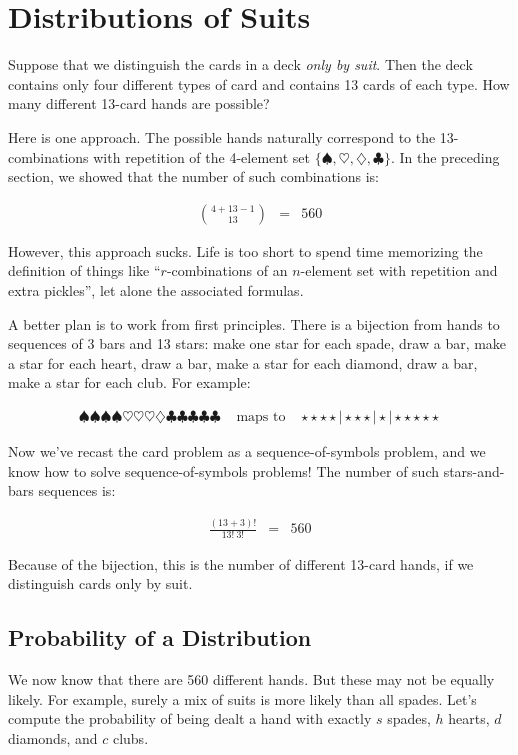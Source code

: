 \documentclass[twoside,12pt]{article}
\newcommand{\beqn}{\begin{eqnarray*}}
\newcommand{\eeqn}{\end{eqnarray*}}
\begin{document}
\section{Distributions of Suits}

Suppose that we distinguish the cards in a deck {\em only by suit}.
Then the deck contains only four different types of card and contains
13 cards of each type.  How many different 13-card hands are possible?

Here is one approach.  The possible hands naturally correspond to the
13-combinations with repetition of the 4-element set $\{ \spadesuit,
\heartsuit, \diamondsuit, \clubsuit \}$.  In the preceding section, we
showed that the number of such combinations is:

\beqn
\binom{4 + 13 - 1}{13} & = & 560
\eeqn

\noindent However, this approach sucks.  Life is too short to spend
time memorizing the definition of things like ``$r$-combinations of an
$n$-element set with repetition and extra pickles'', let alone the
associated formulas.

A better plan is to work from first principles.  There is a
bijection from hands to sequences of 3 bars and 13 stars: make one
star for each spade, draw a bar, make a star for each heart, draw a
bar, make a star for each diamond, draw a bar, make a star for each
club.  For example:

\beqn
\spadesuit
\spadesuit
\spadesuit
\spadesuit
\heartsuit
\heartsuit
\heartsuit
\diamondsuit
\clubsuit
\clubsuit
\clubsuit
\clubsuit
\clubsuit
& \text{ maps to } &
\star \star \star \star \mid
\star \star \star \mid
\star \mid
\star \star \star \star \star
\eeqn

\noindent Now we've recast the card problem as a sequence-of-symbols
problem, and we know how to solve sequence-of-symbols problems!  The
number of such stars-and-bars sequences is:

\beqn
\frac{(13 + 3)!}{13!\ 3!} & = & 560
\eeqn

\noindent Because of the bijection, this is the number of different
13-card hands, if we distinguish cards only by suit.

\subsection{Probability of a Distribution}

We now know that there are 560 different hands.  But these may not be
equally likely.  For example, surely a mix of suits is more likely
than all spades.  Let's compute the probability of being dealt a hand
with exactly $s$ spades, $h$ hearts, $d$ diamonds, and $c$ clubs.
\end{document}

